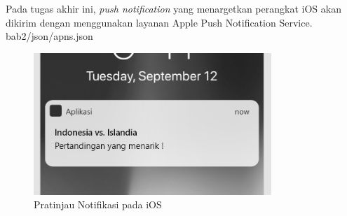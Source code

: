 \par Pada tugas akhir ini, \textit{push notification} yang menargetkan perangkat iOS akan dikirim dengan menggunakan layanan Apple Push Notification Service.
 {bab2/json/apns.json}
\begin{figure}[H]
	\centering\includegraphics[width=0.8\textwidth]{bab2/img/apns.jpg}
	\caption{Pratinjau Notifikasi pada iOS}
	\label{img:contoh-hasil-apns}
\end{figure}

